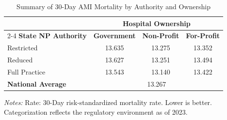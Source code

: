 \begin{table}[htbp]
    \centering
    \caption{Summary of 30-Day AMI Mortality by Authority and Ownership}
    \label{tab:mortality_rate_ami_own}
    \vspace{0.2cm}
    \begin{tabular}{lccc}
        \toprule
        & \multicolumn{3}{c}{\textbf{Hospital Ownership}} \\
        \cmidrule(lr){2-4}
        \textbf{State NP Authority} & \textbf{Government} & \textbf{Non-Profit} & \textbf{For-Profit} \\
        \midrule
        Restricted & 13.635 & 13.275 & 13.352 \\
        Reduced & 13.627 & 13.251 & 13.494 \\
        Full Practice & 13.543 & 13.140 & 13.422 \\
        \midrule
        \textbf{National Average} & \multicolumn{3}{c}{13.267} \\
        \bottomrule
    \end{tabular}
    \vspace{0.1cm}
    \begin{minipage}{0.85\textwidth}
        \footnotesize \textit{Notes:} Rate: 30-Day risk-standardized mortality rate. Lower is better. Categorization reflects the regulatory environment as of 2023.
    \end{minipage}
\end{table}